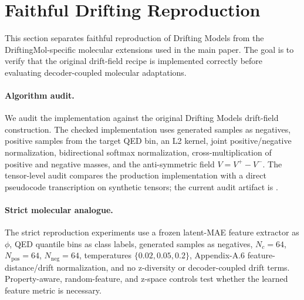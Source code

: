 
\section{Faithful Drifting Reproduction}
\label{sec:supp-faithful-drifting}

This section separates faithful reproduction of Drifting Models from the
DriftingMol-specific molecular extensions used in the main paper. The goal is
to verify that the original drift-field recipe is implemented correctly before
evaluating decoder-coupled molecular adaptations.

\paragraph{Algorithm audit.}
We audit the implementation against the original Drifting Models drift-field
construction. The checked implementation uses generated samples as negatives,
positive samples from the target QED bin, an L2 kernel, joint positive/negative
normalization, bidirectional softmax normalization, cross-multiplication of
positive and negative masses, and the anti-symmetric field $V = V^+ - V^-$.
The tensor-level audit compares the production implementation with a direct
pseudocode transcription on synthetic tensors; the current audit artifact is
.

\paragraph{Strict molecular analogue.}
The strict reproduction experiments use a frozen latent-MAE feature extractor
as $\phi$, QED quantile bins as class labels, generated samples as negatives,
$N_c=64$, $N_{\mathrm{pos}}=64$, $N_{\mathrm{neg}}=64$, temperatures
$\{0.02,0.05,0.2\}$, Appendix-A.6 feature-distance/drift normalization, and
no z-diversity or decoder-coupled drift terms. Property-aware, random-feature,
and z-space controls test whether the learned feature metric is necessary.

\begin{table}[!h]
\centering
\caption{Strict faithful-Drifting core runs. These rows use the Algorithm-2
drift field without decoder-coupled drift or diversity regularization.}
\label{tab:supp-faithful-core}
\resizebox{\columnwidth}{!}{%

}
\end{table}

